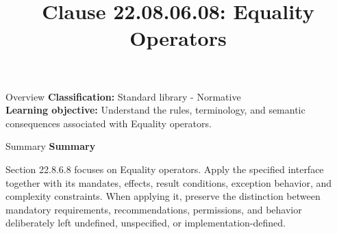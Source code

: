 \documentclass[10pt,letterpaper]{article}
\title{Clause 22.08.06.08: Equality Operators}
\author{}
\date{}
\begin{document}
\maketitle
\begin{CornellOverviewBox}{Overview}
\textbf{Classification:} Standard library - Normative\\[2pt]
\textbf{Learning objective:} Understand the rules, terminology, and semantic consequences associated with Equality operators.
\end{CornellOverviewBox}\begin{CornellSummaryBox}{Summary}
{\sffamily\bfseries\color{Accent} Summary}\par\vspace{3pt}Section 22.8.6.8 focuses on Equality operators. Apply the specified interface together with its mandates, effects, result conditions, exception behavior, and complexity constraints. When applying it, preserve the distinction between mandatory requirements, recommendations, permissions, and behavior deliberately left undefined, unspecified, or implementation-defined.
\end{CornellSummaryBox}
\end{document}

